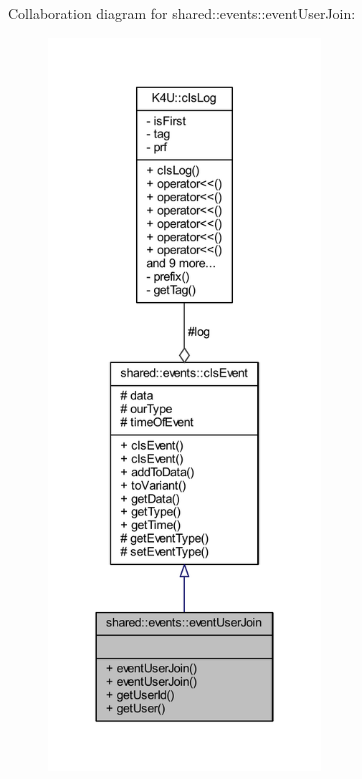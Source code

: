 Collaboration diagram for shared\-:\-:events\-:\-:event\-User\-Join\-:\nopagebreak
\begin{figure}[H]
\begin{center}
\leavevmode
\includegraphics[height=550pt]{d4/dc1/classshared_1_1events_1_1event_user_join__coll__graph}
\end{center}
\end{figure}
